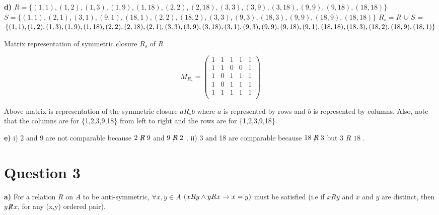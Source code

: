 \documentclass[11pt]{article}
\begin{document}
\newpage
\noindent \textbf{d)} \newline \newline
$R = \{(1,1),(1,2),(1,3),(1,9),(1,18),(2,2),(2,18),(3,3),(3,9),(3,18),(9,9),(9,18),(18,18)\}$ \newline \newline
\noindent
$S = \{(1,1),(2,1),(3,1),(9,1),(18,1),(2,2),(18,2),(3,3),(9,3),(18,3),(9,9),(18,9),(18,18)\}$ \newline \newline
$R_s = R$ $\cup$ $S$ = $\{(1,1),(1,2),(1,3),(1,9),(1,18),(2,2),(2,18),(2,1),(3
,3),(3,9),(3,18),(3,1),\newline  (9,3),(9,9),(9,18),(9,1),(18,18),(18,3),(18,2),(18,9),(18,1)\}$ \newline \newline
\begin{center}
    Matrix representation of symmetric closure $R_s$ of $R$ 
\end{center}
\[
    M_R_s = 
    \begin{pmatrix}
        1 & 1 & 1 & 1 & 1 \\
        1 & 1 & 0 & 0 & 1 \\
        1 & 0 & 1 & 1 & 1 \\
        1 & 0 & 1 & 1 & 1 \\
        1 & 1 & 1 & 1 & 1 \\ 
    \end{pmatrix}
    
\]

Above matrix is representation of the symmetric closure $aR_sb$ where $a$ is represented by rows and $b$ is represented by columns. Also, note that the columns are for \{1,2,3,9,18\} from left to right and the rows are for \{1,2,3,9,18\}.


\noindent \newline \newline \textbf{e)}
\newline \newline i) 2 and 9 are not comparable because $2\not\mathrel{R}9$ and $9\not\mathrel{R}2$ .\newline \newline
ii) 3 and 18 are comparable because $18\not\mathrel{R}3$ but $3$ $R$ $18$ .


\newpage
\section*{Question 3}
\textbf{a)} \newline \newline
For a relation $R$ on $A$ to be anti-symmetric, $\forall x,y \in A $ $\space (xRy \wedge yRx \xrightarrow{} x = y )$ must be satisfied (i.e if $xRy$ and $x$ and $y$ are distinct, then $y$$\not \mathrel{R}$$x$, for any (x,y) ordered pair).  \newline \newline
\end{document}
